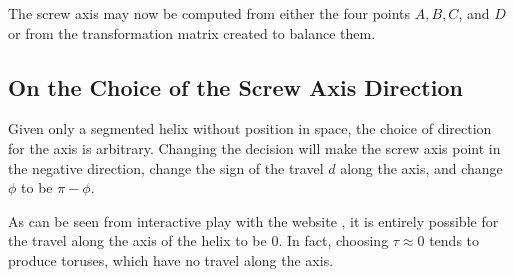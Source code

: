 \documentclass[mathematics,article,submit,pdftex,moreauthors]{Definitions/mdpi}
\begin{document}







The screw axis may now
be computed from either the four points $A,B,C$, and $D$ or from the transformation
matrix created to balance them.

\subsection{On the Choice of the Screw Axis Direction}

Given only a segmented helix without position in space,
the choice of
direction for the axis is arbitrary.
Changing the decision will make the screw axis point in the negative direction,
change the sign of the travel $d$ along the axis, and change $\phi$ to be $\pi - \phi$.

As can be seen from interactive play with the website \cite{segmentedhelixinteractive},
it is entirely possible for the travel along
the axis of the helix to be $0$. In fact, choosing $\tau \approx 0$
tends to produce toruses, which have no
travel along the axis.
\end{document}
